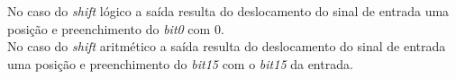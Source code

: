 No caso do \textit{shift} lógico a saída resulta do deslocamento do sinal de entrada uma posição e preenchimento do \textit{bit0} com 0.\\
No caso do \textit{shift} aritmético a saída resulta do deslocamento do sinal de entrada uma posição e preenchimento do \textit{bit15} com o \textit{bit15} da entrada.\\
